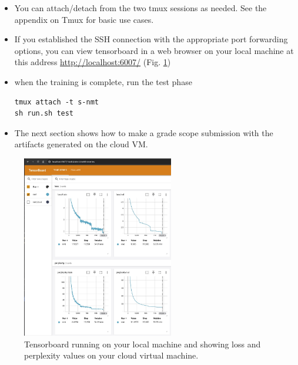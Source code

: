 \begin{itemize}
    \item You can attach/detach from the two tmux sessions as needed. See the appendix on Tmux for basic use cases.
    \item If you established the SSH connection with the appropriate port forwarding options, you can view tensorboard in a web browser on your local machine at this address  \href{http://localhost:6007/}{http://localhost:6007/} (Fig. \ref{fig:tensorboard-gpu})

    \item when the training is complete, run the test phase

\begin{lstlisting}
tmux attach -t s-nmt
sh run.sh test
\end{lstlisting}

    \item The next section shows how to make a grade scope submission with the artifacts generated on the cloud VM.
\end{itemize}




\begin{figure}[h]
    \centering
    \includegraphics[height=8cm]{images/tensorboard_gpu.jpg}
    \caption{Tensorboard running on your local machine and showing loss and perplexity values on your cloud virtual machine.}
    \label{fig:tensorboard-gpu}
\end{figure}




